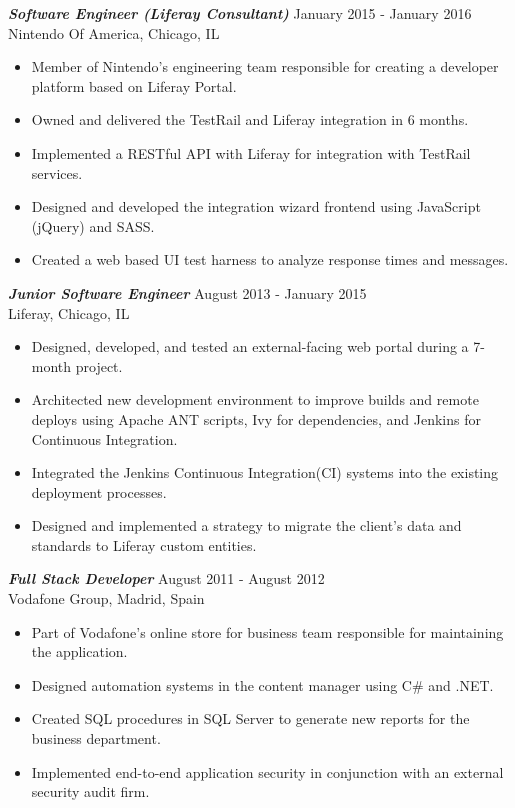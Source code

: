 \documentclass[overlapped, 10pt]{res} %
\begin{document}
\begin{resume}
{\sl \textbf{Software Engineer (Liferay Consultant)}} \hfill January 2015 - January 2016 \\
Nintendo Of America, Chicago, IL
\begin{itemize} 
\item Member of Nintendo’s engineering team responsible for creating a developer platform based on Liferay Portal.
\item Owned and delivered the TestRail and Liferay integration in 6 months.
\item Implemented a RESTful API with Liferay for integration with TestRail services.
\item Designed and developed the integration wizard frontend using JavaScript (jQuery) and SASS.
\item Created a web based UI test harness to analyze response times and messages.
\end{itemize} 

{\sl \textbf{Junior Software Engineer}} \hfill August 2013 - January 2015 \\
Liferay, Chicago, IL
\begin{itemize} 
\item Designed, developed, and tested an external-facing web portal during a 7-month project.
\item Architected new development environment to improve builds and remote deploys using Apache ANT scripts, Ivy for dependencies, and Jenkins for Continuous Integration.
\item Integrated the Jenkins Continuous Integration(CI) systems into the existing deployment processes.
\item Designed and implemented a strategy to migrate the client’s data and standards to Liferay custom entities.
\end{itemize} 

{\sl \textbf{Full Stack Developer}} \hfill August 2011 - August 2012 \\
Vodafone Group, Madrid, Spain
\begin{itemize} 
\item Part of Vodafone’s online store for business team responsible for maintaining the application.
\item Designed automation systems in the content manager using C\# and .NET.
\item Created SQL procedures in SQL Server to generate new reports for the business department.
\item Implemented end-to-end application security in conjunction with an external security audit firm.
\end{itemize} 


\end{resume}
\end{document}
